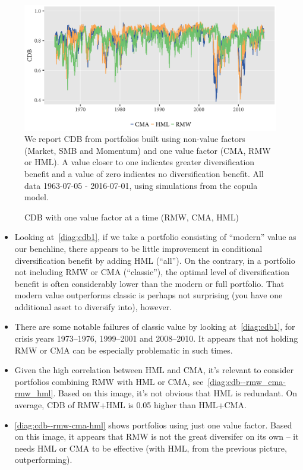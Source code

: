 \begin{figure}[H]
  \caption{CDB with one value factor at a time (RMW, CMA, HML)}
  \label{diag:cdb--rmw-cma-hml}
  \toprule
  \centering
  \begin{minipage}{\textwidth}
  \includegraphics[width=\textwidth]{graphics/cdb--rmw-cma-hml.png}
  \bottomrule
  \vspace{3mm}
  \footnotesize
  We report CDB from portfolios built using non-value factors (Market, SMB and Momentum) and one value factor (CMA, RMW or HML). A value closer to one indicates greater diversification benefit and a value of zero indicates no diversification benefit. All data 1963-07-05 - 2016-07-01, using simulations from the copula model.
  \end{minipage}
\end{figure}

\begin{itemize}
  \item Looking at~\autoref{diag:cdb1}, if we take a portfolio consisting of ``modern'' value as our benchline, there appears to be little improvement in conditional diversification benefit by adding HML (``all''). On the contrary, in a portfolio not including RMW or CMA (``classic''), the optimal level of diversification benefit is often considerably lower than the modern or full portfolio. That modern value outperforms classic is perhaps not surprising (you have one additional asset to diversify into), however.
  \item There are some notable failures of classic value by looking at~\autoref{diag:cdb1}, for crisis years 1973--1976, 1999--2001 and 2008--2010. It appears that not holding RMW or CMA can be especially problematic in such times.
  \item Given the high correlation between HML and CMA, it's relevant to consider portfolios combining RMW with HML or CMA, see~\autoref{diag:cdb--rmw_cma-rmw_hml}. Based on this image, it's not obvious that HML is redundant. On average, CDB of RMW+HML is 0.05 higher than HML+CMA.
  \item \autoref{diag:cdb--rmw-cma-hml} shows portfolios using just one value factor. Based on this image, it appears that RMW is not the great diversifer on its own -- it needs HML or CMA to be effective (with HML, from the previous picture, outperforming).
\end{itemize}
